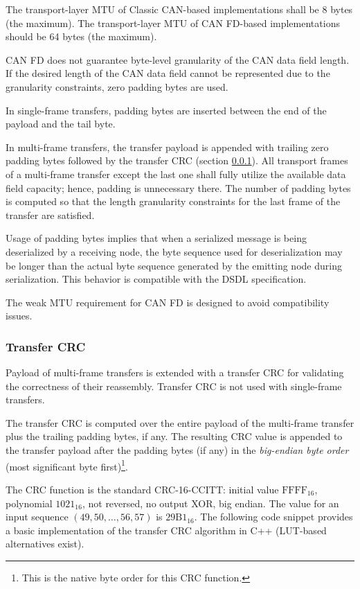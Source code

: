The transport-layer MTU of Classic CAN-based implementations shall be 8 bytes (the maximum).
The transport-layer MTU of CAN FD-based implementations should be 64 bytes (the maximum).

CAN FD does not guarantee byte-level granularity of the CAN data field length.
If the desired length of the CAN data field cannot be represented due to the granularity constraints,
zero padding bytes are used.

In single-frame transfers, padding bytes are inserted between the end of the payload and the tail byte.

In multi-frame transfers, the transfer payload is appended with trailing zero padding bytes
followed by the transfer CRC (section \ref{sec:transport_can_transfer_crc}).
All transport frames of a multi-frame transfer except the last one shall fully utilize the available
data field capacity; hence, padding is unnecessary there.
The number of padding bytes is computed so that the length granularity constraints
for the last frame of the transfer are satisfied.

\begin{remark}
    Usage of padding bytes implies that when a serialized message is being deserialized by a receiving node,
    the byte sequence used for deserialization may be longer than the actual byte sequence generated by the
    emitting node during serialization.
    This behavior is compatible with the DSDL specification.

    The weak MTU requirement for CAN FD is designed to avoid compatibility issues.
\end{remark}

\subsubsection{Transfer CRC}\label{sec:transport_can_transfer_crc}

Payload of multi-frame transfers is extended with a transfer CRC for validating the correctness of their reassembly.
Transfer CRC is not used with single-frame transfers.

The transfer CRC is computed over the entire payload of the multi-frame transfer
plus the trailing padding bytes, if any.
The resulting CRC value is appended to the transfer payload after the padding bytes (if any)
in the \emph{big-endian byte order} (most significant byte first)\footnote{%
    This is the native byte order for this CRC function.
}.

The CRC function is the standard CRC-16-CCITT:
initial value $\mathrm{FFFF}_{16}$, polynomial $\mathrm{1021}_{16}$,
not reversed, no output XOR, big endian.
The value for an input sequence $\left(49, 50, \ldots, 56, 57\right)$ is $\mathrm{29B1}_{16}$.
The following code snippet provides a basic implementation of the transfer CRC algorithm in C++
(LUT-based alternatives exist).

